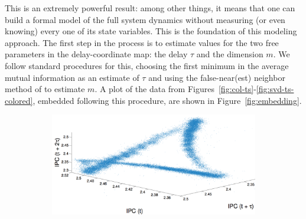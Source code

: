 This is an extremely powerful result: among other things, it means
that one can build a formal model of the full system dynamics without
measuring (or even knowing) every one of its state variables.  This is
the foundation of this modeling approach.
The first step in the process is to estimate values for the two free
parameters in the delay-coordinate map: the delay $\tau$ and the
dimension $m$.  We follow standard procedures for this, choosing the
first minimum in the average mutual information as an estimate of
$\tau$ \cite{fraser-swinney} and using the false-near(est) neighbor
method of \cite{KBA92} to estimate $m$.  A
plot of the data from Figures~\ref{fig:col-ts}-\ref{fig:svd-ts-colored}, embedded following this
procedure, are shown in Figure~\ref{fig:embedding}.


 \begin{figure}
   \centering
\begin{subfigure}{\columnwidth}
    \includegraphics[width=\columnwidth]{figs/colipc3d.png}
    \caption{\col }
    \label{fig:colEmbedding}
  \end{subfigure}%
  

\end{figure}
